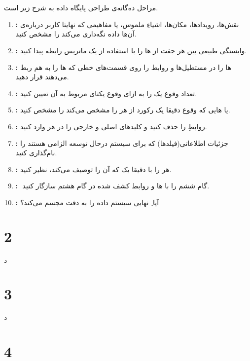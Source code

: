 \documentclass{article}
\begin{document}


\newpage


\section{}
مراحل ده‌گانه‌ی طراحی پایگاه داده به شرح زیر است.
\begin{enumerate}
    \item \textbf{:}
نقش‌ها، رویدادها، مکان‌ها، اشیاءِ ملموس، یا مفاهیمی که نهایتا کاربر درباره‌ی آن‌ها داده نگه‌داری می‌کند را مشخص کنید.
    \item \textbf{:}
وابستگی طبیعی بین هر جفت از ها را با استفاده از یک ماتریس رابطه پیدا کنید.
	\item \textbf{:}
ها را در مستطیل‌ها و روابط را روی قسمت‌های خطی که ها را به هم ربط می‌دهند قرار دهید.
	\item \textbf{:}
تعداد وقوع یک  را به ازای وقوع یکتای  مربوط به آن تعیین کنید.
	\item \textbf{:}
 یا هایی که وقوع دقیقا یک رکورد از هر  را مشخص می‌کند را مشخص کنید.
	\item \textbf{:}
روابطِ  را حذف کنید و کلید‌های اصلی و خارجی را در هر  وارد کنید.
	\item \textbf{:}
جزئیات اطلاعاتی(فیلدها) که برای سیستم درحال توسعه الزامی هستند را نام‌گذاری کنید.
	\item \textbf{:}
هر  را با دقیقا یک  که آن را توصیف می‌کند، نظیر کنید.
	\item \textbf{:}
ِ گام ششم را با ها و روابط کشف شده در گام هشتم سازگار کنید.
	\item \textbf{:}
آیا ِ نهایی سیستم داده را به دقت مجسم می‌کند؟
\end{enumerate}

\section{2}
د
\section{3}
د
\section{4}
\end{document}
